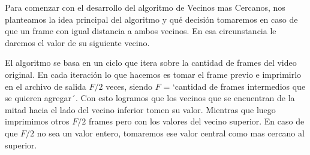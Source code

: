 \par Para comenzar con el desarrollo del algoritmo de Vecinos mas Cercanos, nos planteamos la idea principal del algoritmo y qu\'e decisi\'on tomaremos en caso de que un frame con igual distancia a ambos vecinos. En esa circunstancia le daremos el valor de su siguiente vecino.

\par El algoritmo se basa en un ciclo que itera sobre la cantidad de frames del video original. En cada iteraci\'on lo que hacemos es tomar el frame previo e imprimirlo en el archivo de salida $F / 2$ veces, siendo $F$ = `cantidad de frames intermedios que se quieren agregar´. Con esto logramos que los vecinos que se encuentran de la mitad hacia el lado del vecino inferior tomen su valor. Mientras que luego imprimimos otros $F / 2$ frames pero con los valores del vecino superior. En caso de que $F / 2$ no sea un valor entero, tomaremos ese valor central como mas cercano al superior.